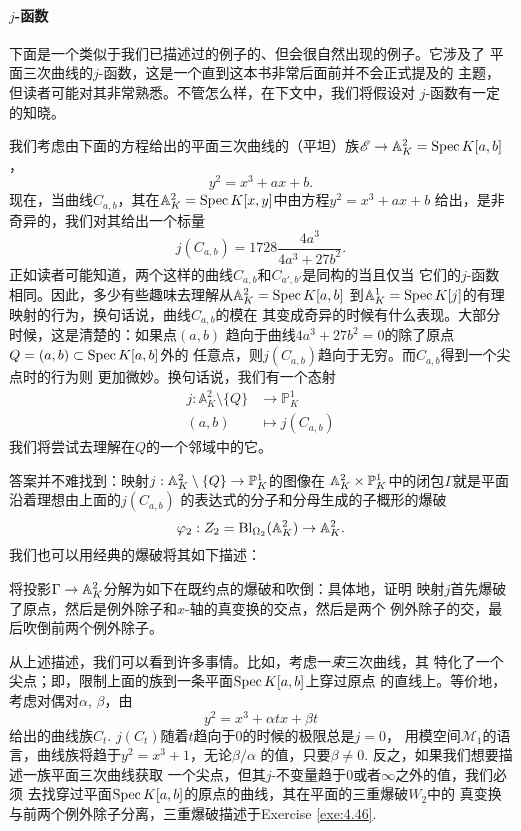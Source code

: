 \paragraph*{$j$-函数}
下面是一个类似于我们已描述过的例子的、但会很自然出现的例子。它涉及了
平面三次曲线的$j$-函数，这是一个直到这本书非常后面前并不会正式提及的
主题，但读者可能对其非常熟悉。不管怎么样，在下文中，我们将假设对
$j$-函数有一定的知晓。

我们考虑由下面的方程给出的平面三次曲线的（平坦）族$\mathscr E\to 
\mathbb{A}_K^2=\operatorname{Spec} K[a,b]$，
\[
	y^2=x^3+ax+b.
\]
现在，当曲线$C_{a,b}$，其在$\mathbb{A}_K^2=\operatorname{Spec} K[x,y]$中由方程$y^2=x^3+ax+b$
给出，是非奇异的，我们对其给出一个标量
\[
	j(C_{a,b})=1728\frac{4a^3}{4a^3+27b^2}.
\]
正如读者可能知道，两个这样的曲线$C_{a,b}$和$C_{a',b'}$是同构的当且仅当
它们的$j$-函数相同。因此，多少有些趣味去理解从$\mathbb{A}_K^2=\operatorname{Spec} K[a,b]$
到$\mathbb{A}_K^1=\operatorname{Spec} K[j]$的有理映射的行为，换句话说，曲线$C_{a,b}$的模在
其变成奇异的时候有什么表现。大部分时候，这是清楚的：如果点$(a,b)$
趋向于曲线$4a^3+27b^2=0$的除了原点$Q=(a,b)\subset \operatorname{Spec} K[a,b]$外的
任意点，则$j(C_{a,b})$趋向于无穷。而$C_{a,b}$得到一个尖点时的行为则
更加微妙。换句话说，我们有一个态射
\[
	\begin{aligned}
		j:\mathbb A_K^2\setminus \{Q\}&\longrightarrow \mathbb P_K^1 \\
		(a,b)&\longmapsto j(C_{a,b})
	\end{aligned}
\]
我们将尝试去理解在$Q$的一个邻域中的它。

答案并不难找到：映射$j:\mathbb{A}_K^2\setminus \{Q\}\to \mathbb{P}_K^1$的图像在
$\mathbb{A}_K^2\times \mathbb{P}_K^1$中的闭包$\Gamma$就是平面沿着理想由上面的$j(C_{a,b})$
的表达式的分子和分母生成的子概形的爆破
\[
	\varphi_2:Z_2=\operatorname{Bl}_{\Omega_2}(\mathbb A_K^2)\to \mathbb A_K^2.
\]
我们也可以用经典的爆破将其如下描述：


\begin{exe}\label{exe:4.46}
将投影$\Gamma\to \mathbb{A}_K^2$分解为如下在既约点的爆破和吹倒：具体地，证明
映射$j$首先爆破了原点，然后是例外除子和$x$-轴的真变换的交点，然后是两个
例外除子的交，最后吹倒前两个例外除子。
\end{exe}

从上述描述，我们可以看到许多事情。比如，考虑一\emph{束}三次曲线，其
特化了一个尖点；即，限制上面的族到一条平面$\operatorname{Spec} K[a,b]$上穿过原点
的直线上。等价地，考虑对偶对$\alpha$, $\beta$，由
\[
	y^2=x^3+\alpha tx+\beta t
\]
给出的曲线族$C_t$. $j(C_t)$随着$t$趋向于$0$的时候的极限总是$j=0$，
用模空间$\mathscr M_1$的语言，曲线族将趋于$y^2=x^3+1$，无论$\beta/\alpha$
的值，只要$\beta\neq 0$. 反之，如果我们想要描述一族平面三次曲线获取
一个尖点，但其$j$-不变量趋于$0$或者$\infty$之外的值，我们必须
去找穿过平面$\operatorname{Spec} K[a,b]$的原点的曲线，其在平面的三重爆破$W_2$中的
真变换与前两个例外除子分离，三重爆破描述于Exercise \ref{exe:4.46}.


